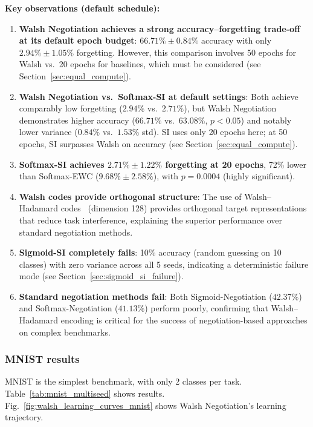 \documentclass[preprint,review,12pt]{elsarticle}
\begin{document}
\textbf{Key observations (default schedule):}
\begin{enumerate}
\item \textbf{Walsh Negotiation achieves a strong accuracy--forgetting trade-off at its default epoch budget}: $66.71\% \pm 0.84\%$ accuracy with only $2.94\% \pm 1.05\%$ forgetting. However, this comparison involves 50 epochs for Walsh vs.\ 20 epochs for baselines, which must be considered (see Section~\ref{sec:equal_compute}).

\item \textbf{Walsh Negotiation vs.\ Softmax-SI at default settings}: Both achieve comparably low forgetting ($2.94\%$ vs.\ $2.71\%$), but Walsh Negotiation demonstrates higher accuracy ($66.71\%$ vs.\ $63.08\%$, $p < 0.05$) and notably lower variance ($0.84\%$ vs.\ $1.53\%$ std). SI uses only 20 epochs here; at 50 epochs, SI surpasses Walsh on accuracy (see Section~\ref{sec:equal_compute}).

\item \textbf{Softmax-SI achieves $2.71\% \pm 1.22\%$ forgetting at 20 epochs}, 72\% lower than Softmax-EWC ($9.68\% \pm 2.58\%$), with $p = 0.0004$ (highly significant).

\item \textbf{Walsh codes provide orthogonal structure}: The use of Walsh--Hadamard codes~\cite{korhan2023negotiated} (dimension 128) provides orthogonal target representations that reduce task interference, explaining the superior performance over standard negotiation methods.

\item \textbf{Sigmoid-SI completely fails}: 10\% accuracy (random guessing on 10 classes) with zero variance across all 5 seeds, indicating a deterministic failure mode (see Section~\ref{sec:sigmoid_si_failure}).

\item \textbf{Standard negotiation methods fail}: Both Sigmoid-Negotiation ($42.37\%$) and Softmax-Negotiation ($41.13\%$) perform poorly, confirming that Walsh--Hadamard encoding is critical for the success of negotiation-based approaches on complex benchmarks.
\end{enumerate}

\subsubsection{MNIST results}

MNIST is the simplest benchmark, with only 2 classes per task. Table~\ref{tab:mnist_multiseed} shows results. Fig.~\ref{fig:walsh_learning_curves_mnist} shows Walsh Negotiation's learning trajectory.
\end{document}
